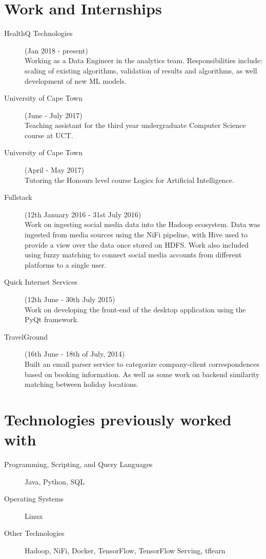 \documentclass[margin,line,a4paper]{resume}
\begin{document}
\begin{resume}
        \section{\mysidestyle Work and Internships}
            \begin{description}
            	\item[HealthQ Technologies] (Jan 2018 - present) \\
            		Working as a Data Engineer in the analytics team. Responsibilities include: scaling of existing algorithms, validation of results and algorithms, as well development of new ML models.

            	\item[University of Cape Town] (June - July 2017) \\
            		Teaching assistant for the third year undergraduate Computer Science course at UCT.

            	\item[University of Cape Town] (April - May 2017) \\
            		Tutoring the Honours level course Logics for Artificial Intelligence.

                \item[Fullstack] (12th January 2016 - 31st July 2016) \\
                    Work on ingesting social media data into the Hadoop ecosystem. Data was ingested from media sources using the NiFi pipeline, with Hive used to provide a view over the data once stored on HDFS. Work also included using fuzzy matching to connect social media accounts from different platforms to a single user.

                \item[Quick Internet Services] (12th June - 30th July 2015) \\
                    Work on developing the front-end of the desktop application using the PyQt framework.

                \item[TravelGround] (16th June - 18th of July, 2014) \\
                    Built an email parser service to categorize company-client correspondences based on booking information. As well as some work on backend similarity matching between holiday locations.

            \end{description}

        \section{\mysidestyle Technologies previously worked with}
        	\begin{description}
	        	\item [Programming, Scripting, and Query Languages] Java, Python, SQL
	 			\item [Operating Systems] Linux
	 			\item [Other Technologies] Hadoop, NiFi, Docker, TensorFlow, TensorFlow Serving, tflearn
	 		\end{description}


\end{resume}
\end{document}
